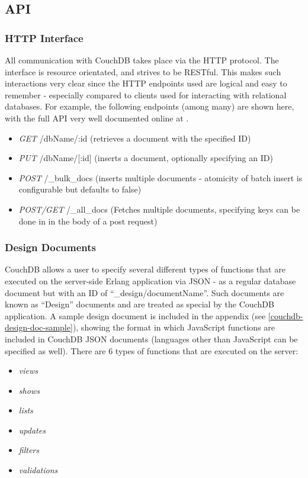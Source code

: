 \subsection{API}
\subsubsection{HTTP Interface}
All communication with CouchDB takes place via the HTTP protocol. The interface is resource orientated, and strives to be RESTful. This makes such interactions very clear since the HTTP endpoints used are logical and easy to remember - especially compared to clients used for interacting with relational databases. For example, the following endpoints (among many) are shown here, with the full API very well documented online at \cite{couch-api}.

\begin{itemize}
    \item \textit{GET} /dbName/:id (retrieves a document with the specified ID)
    \item \textit{PUT} /dbName/[:id] (inserts a document, optionally specifying an ID)
    \item \textit{POST} /\_bulk\_docs (inserts multiple documents - atomicity of batch insert is configurable but defaults to false)
    \item \textit{POST/GET} /\_all\_docs (Fetches multiple documents, specifying keys can be done in in the body of a post request)
\end{itemize}

\subsubsection{Design Documents}
CouchDB allows a user to specify several different types of functions that are executed on the server-side Erlang application via JSON - as a regular database document but with an ID of ``\_design/documentName''. Such documents are known as ``Design'' documents and are treated as special by the CouchDB application. A sample design document is included in the appendix (see \ref{couchdb-design-doc-sample}), showing the format in which JavaScript functions are included in CouchDB JSON documents (languages other than JavaScript can be specified as well). There are 6 types of functions that are executed on the server:

\begin{itemize}
    \item \textit{views}
    \item \textit{shows}
    \item \textit{lists}
    \item \textit{updates}
    \item \textit{filters}
    \item \textit{validations}
\end{itemize}

